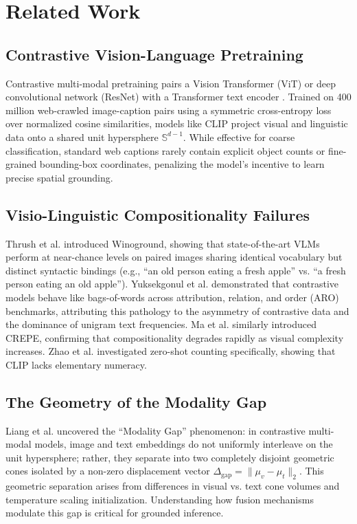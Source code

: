 \documentclass[conference]{IEEEtran}
\begin{document}
\section{Related Work}
\label{sec:related_work}

\subsection{Contrastive Vision-Language Pretraining}
Contrastive multi-modal pretraining pairs a Vision Transformer (ViT) \cite{dosovitskiy2021image} or deep convolutional network (ResNet) \cite{he2016deep} with a Transformer text encoder \cite{vaswani2017attention, devlin2019bert}. Trained on 400 million web-crawled image-caption pairs using a symmetric cross-entropy loss over normalized cosine similarities, models like CLIP \cite{radford2021learning} project visual and linguistic data onto a shared unit hypersphere $\mathbb{S}^{d-1}$. While effective for coarse classification, standard web captions rarely contain explicit object counts or fine-grained bounding-box coordinates, penalizing the model's incentive to learn precise spatial grounding.

\subsection{Visio-Linguistic Compositionality Failures}
Thrush et al. \cite{thrush2022winoground} introduced Winoground, showing that state-of-the-art VLMs perform at near-chance levels on paired images sharing identical vocabulary but distinct syntactic bindings (e.g., ``an old person eating a fresh apple'' vs. ``a fresh person eating an old apple''). Yuksekgonul et al. \cite{yuksekgonul2023when} demonstrated that contrastive models behave like bags-of-words across attribution, relation, and order (ARO) benchmarks, attributing this pathology to the asymmetry of contrastive data and the dominance of unigram text frequencies. Ma et al. \cite{ma2023crepe} similarly introduced CREPE, confirming that compositionality degrades rapidly as visual complexity increases. Zhao et al. \cite{zhao2023probing} investigated zero-shot counting specifically, showing that CLIP lacks elementary numeracy.

\subsection{The Geometry of the Modality Gap}
Liang et al. \cite{liang2022mind} uncovered the ``Modality Gap'' phenomenon: in contrastive multi-modal models, image and text embeddings do not uniformly interleave on the unit hypersphere; rather, they separate into two completely disjoint geometric cones isolated by a non-zero displacement vector $\Delta_{\text{gap}} = \|\mu_v - \mu_t\|_2$. This geometric separation arises from differences in visual vs. text cone volumes and temperature scaling initialization. Understanding how fusion mechanisms modulate this gap is critical for grounded inference.
\end{document}
